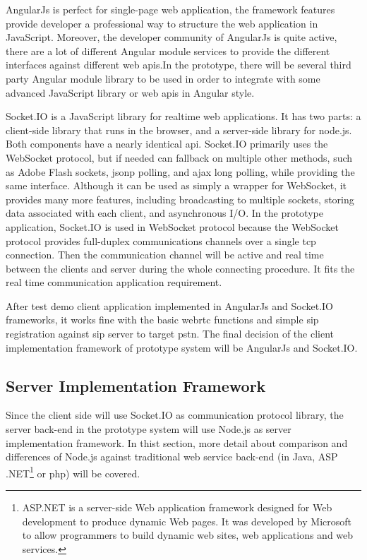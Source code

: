 \par AngularJs is perfect for single-page web application, the framework features provide developer a professional way to structure the web application in JavaScript. Moreover, the developer community of AngularJs is quite active, there are a lot of different Angular module services to provide the different interfaces against different web \gls{api}s.In the prototype, there will be several third party Angular module library to be used in order to integrate with some advanced JavaScript library or web \gls{api}s in Angular style.

\par Socket.IO is a JavaScript library for realtime web applications. It has two parts: a client-side library that runs in the browser, and a server-side library for node.js. Both components have a nearly identical \gls{api}. Socket.IO primarily uses the WebSocket protocol, but if needed can fallback on multiple other methods, such as Adobe Flash sockets, \gls{jsonp} polling, and \gls{ajax} long polling, while providing the same interface. Although it can be used as simply a wrapper for WebSocket, it provides many more features, including broadcasting to multiple sockets, storing data associated with each client, and asynchronous I/O.\cite{wiki:socketio} In the prototype application, Socket.IO is used in WebSocket protocol because the WebSocket protocol provides full-duplex communications channels over a single \gls{tcp} connection. Then the communication channel will be active and real time between the clients and server during the whole connecting procedure. It fits the real time communication application requirement.

\par After test demo client application implemented in AngularJs and Socket.IO frameworks, it works fine with the basic \gls{webrtc} functions and simple \gls{sip} registration against \gls{sip} server to target \gls{pstn}. The final decision of the client implementation framework of prototype system will be AngularJs and Socket.IO.

\subsection{Server Implementation Framework}

\noindent Since the client side will use Socket.IO as communication protocol library, the server back-end in the prototype system will use Node.js as server implementation framework. In thist section, more detail about comparison and differences of Node.js against traditional web service back-end (in Java, ASP .NET\footnote{ASP.NET is a server-side Web application framework designed for Web development to produce dynamic Web pages. It was developed by Microsoft to allow programmers to build dynamic web sites, web applications and web services.\cite{wiki:asp}} or \gls{php}) will be covered.

